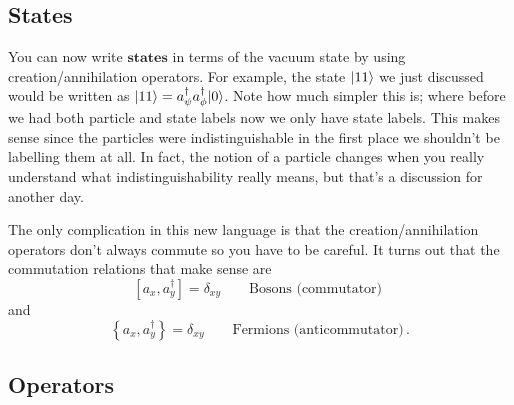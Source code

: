 \documentclass{article}
\begin{document}
\subsection{States}

You can now write $\textbf{states}$ in terms of the vacuum state by using creation/annihilation operators.
For example, the state $| 11 \rangle$ we just discussed would be written as $| 11 \rangle = a_{\psi}^{\dagger}a_{\phi}^{\dagger}| 0 \rangle$.
Note how much simpler this is; where before we had both particle and state labels now we only have state labels.
This makes sense since the particles were indistinguishable in the first place we shouldn't be labelling them at all.
In fact, the notion of a particle changes when you really understand what indistinguishability really means, but that's a discussion for another day.

The only complication in this new language is that the creation/annihilation operators don't always commute so you have to be careful.
It turns out that the commutation relations that make sense are
\begin{equation}
\left[a_{x},a_{y}^{\dagger}\right]=\delta_{xy}\qquad\textrm{Bosons (commutator) }
\end{equation}
and
\begin{equation}
\left\{ a_{x},a_{y}^{\dagger}\right\} =\delta_{xy}\qquad\textrm{Fermions (anticommutator)} \, .
\end{equation}

\subsection{Operators}
\end{document}
